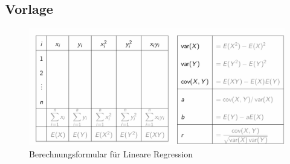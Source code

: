 \documentclass[../Main.tex]{subfiles}
\begin{document}
\subsection{Vorlage}
\begin{figure}[H]
    \centering
    \includegraphics[angle=90,height=1\textwidth]{Images/berechnungsformular-lineare-regression.png}
    \caption{Berechnungsformular für Lineare Regression}
\end{figure}
\newpage
\end{document}
